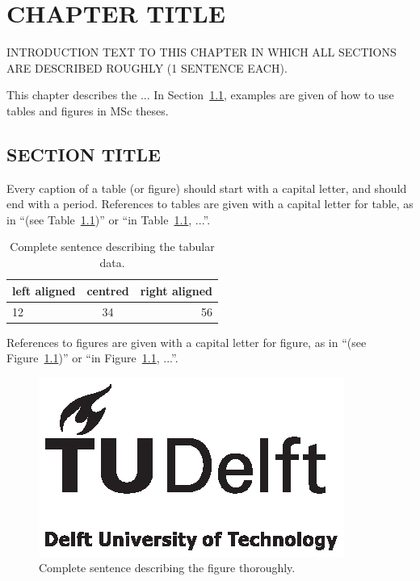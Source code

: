 \chapter{CHAPTER TITLE}
\label{chp:CHAPTERTITLE}
INTRODUCTION TEXT TO THIS CHAPTER IN WHICH ALL SECTIONS ARE DESCRIBED ROUGHLY (1 SENTENCE EACH).

This chapter describes the ... In Section~\ref{sec:SECTIONTITLE}, examples are given of how to use tables and figures in MSc theses.

\section{SECTION TITLE}
\label{sec:SECTIONTITLE}

Every caption of a table (or figure) should start with a capital letter, and should end with a period. References to tables are given with a capital letter for table, as in ``(see Table~\ref{tab:EXAMPLETABLE})'' or ``in Table~\ref{tab:EXAMPLETABLE}, ...''.

\begin{table}[htb]
\centering
\begin{tabular}{|l|c|r|}
\hline %
left aligned & centred & right aligned \\
\hline \hline
12           & 34      & 56            \\
\hline
\end{tabular}
\caption{Complete sentence describing the tabular data.}
\label{tab:EXAMPLETABLE}
\end{table}

References to figures are given with a capital letter for figure, as in ``(see Figure~\ref{fig:EXAMPLEFIGURE})'' or ``in Figure~\ref{fig:EXAMPLEFIGURE}, ...''.

\begin{figure}[htb]
\includegraphics[angle=180,width=\textwidth]{pics/TUD_logo_zw}
\caption{Complete sentence describing the figure thoroughly.}
\label{fig:EXAMPLEFIGURE}
\end{figure}

